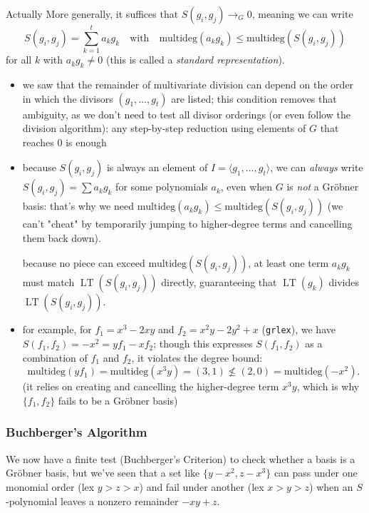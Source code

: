 \documentclass[a4paper, 11pt]{report}
\newcommand{\LT}{\operatorname{LT}}
\begin{document}
\begin{gframe}{Actually}
More generally, it suffices that $S(g_i, g_j) \to_G 0$, meaning we can write
$$ S(g_i, g_j) = \sum_{k=1}^{t} a_k g_k \quad \text{with} \quad \text{multideg}(a_k g_k) \le \text{multideg}(S(g_i, g_j)) $$
for all $k$ with $a_k g_k \neq 0$ (this is called a \emph{standard representation}).

\begin{itemize}
    \item we saw that the remainder of multivariate division can depend on the order in which the divisors $(g_1, \dots, g_t)$ are listed; this condition removes that ambiguity, as we don't need to test all divisor orderings (or even follow the division algorithm): any step-by-step reduction using elements of $G$ that reaches $0$ is enough
    
    \item because $S(g_i, g_j)$ is always an element of $I = \langle g_1, \dots, g_t \rangle$, we can \emph{always} write $S(g_i, g_j) = \sum a_k g_k$ for some polynomials $a_k$, even when $G$ is \emph{not} a Gröbner basis: that's why we need $\text{multideg}(a_k g_k) \le \text{multideg}(S(g_i, g_j))$ (we can't "cheat" by temporarily jumping to higher-degree terms and cancelling them back down).

        because no piece can exceed $\text{multideg}(S(g_i, g_j))$, at least one term $a_k g_k$ must match $\LT(S(g_i, g_j))$ directly, guaranteeing that $\LT(g_k)$ divides $\LT(S(g_i, g_j))$.
    
    \item for example, for $f_1 = x^3 - 2xy$ and $f_2 = x^2y - 2y^2 + x$ (\texttt{grlex}), we have $S(f_1, f_2) = -x^2 = y f_1 - x f_2$; though this expresses $S(f_1, f_2)$ as a combination of $f_1$ and $f_2$, it violates the degree bound:
    $$ \text{multideg}(y f_1) = \text{multideg}(x^3y) = (3,1) \not\le (2,0) = \text{multideg}(-x^2). $$
    (it relies on creating and cancelling the higher-degree term $x^3y$, which is why $\{f_1, f_2\}$ fails to be a Gröbner basis)
\end{itemize}


\end{gframe}

\subsubsection{Buchberger's Algorithm}
We now have a finite test (Buchberger's Criterion) to check whether a basis is a Gröbner basis, but we've seen that a set like $\{y - x^2, z - x^3\}$ can pass under one monomial order (lex $y > z > x$) and fail under another (lex $x > y > z$) when an $S$-polynomial leaves a nonzero remainder $-xy + z$. 
\end{document}
